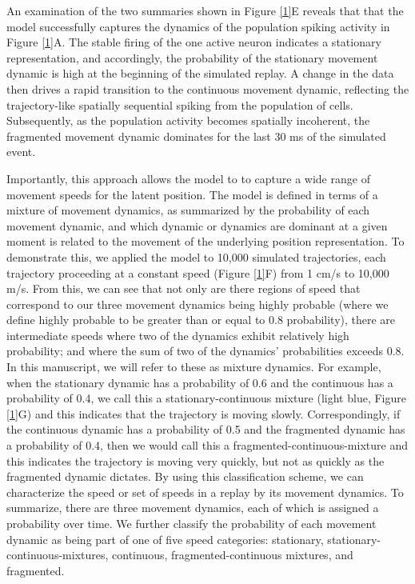 \documentclass[times, twoside]{zHenriquesLab-StyleBioRxiv}
\begin{document}
An examination of the two summaries shown in Figure \ref{1}E reveals that that the model successfully captures the dynamics of the population spiking activity in Figure \ref{1}A. The stable firing of the one active neuron indicates a stationary representation, and accordingly, the probability of the stationary movement dynamic is high at the beginning of the simulated replay. A change in the data then drives a rapid transition to the continuous movement dynamic, reflecting the trajectory-like spatially sequential spiking from the population of cells. Subsequently, as the population activity becomes spatially incoherent, the fragmented movement dynamic dominates for the last 30 ms of the simulated event.

Importantly, this approach allows the model to to capture a wide range of movement speeds for the latent position. The model is defined in terms of a mixture of movement dynamics, as summarized by the probability of each movement dynamic, and which dynamic or dynamics are dominant at a given moment is related to the movement of the underlying position representation. To demonstrate this, we applied the model to 10,000 simulated trajectories, each trajectory proceeding at a constant speed (Figure \ref{1}F) from 1 cm/s to 10,000 m/s. From this, we can see that not only are there regions of speed that correspond to our three movement dynamics being highly probable (where we define highly probable to be greater than or equal to 0.8 probability), there are intermediate speeds where two of the dynamics exhibit relatively high probability; and where the sum of two of the dynamics' probabilities exceeds 0.8. In this manuscript, we will refer to these as mixture dynamics. For example, when the stationary dynamic has a probability of 0.6 and the continuous has a probability of 0.4, we call this a stationary-continuous mixture (light blue, Figure \ref{1}G) and this indicates that the trajectory is moving slowly. Correspondingly, if the continuous dynamic has a probability of 0.5 and the fragmented dynamic has a probability of 0.4, then we would call this a fragmented-continuous-mixture and this indicates the trajectory is moving very quickly, but not as quickly as the fragmented dynamic dictates. By using this classification scheme, we can characterize the speed or set of speeds in a replay by its movement dynamics. To summarize, there are three movement dynamics, each of which is assigned a probability over time. We further classify the probability of each movement dynamic as being part of one of five speed categories: stationary, stationary-continuous-mixtures, continuous, fragmented-continuous mixtures, and fragmented.
\end{document}
